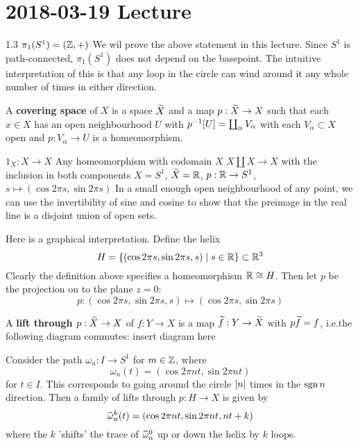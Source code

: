 \section{2018-03-19 Lecture}

1.3 $\pi_1(S^1)=(\mathbb{Z},+)$
We wil prove the above statement in this lecture.
Since $S^1$ is path-connected, $\pi_1(S^1)$ does not depend on the basepoint.
The intuitive interpretation of this is that any loop in the circle can wind around it any whole number of times in either direction.

\begin{defn}
	A \textbf{covering space} of $X$ is a space $\widetilde{X}$ and a map $p: \widetilde X \to X$ such that each $x \in X$ has an open neighbourhood $U$ with $p^{-1}[U] = \coprod_\alpha V_\alpha$ with each $V_\alpha \subset X$ open and $p: V_\alpha \to U$ is a homeomorphism.
\end{defn}

\begin{exam}
	\begin{itm}
		\io $1_X: X \to X$
		\io Any homeomorphism with codomain $X$
		\io $X \amalg X \to X$ with the inclusion in both components
		\io $X=S^1$, $\widetilde X = \mathbb{R}$, $p: \mathbb{R} \to S^1$, $s \mapsto (\cos 2\pi s, \sin 2\pi s)$
		In a small enough open neighbourhood of any point, we can use the invertibility of sine and cosine to show that the preimage in the real line is a disjoint union of open sets.
		
		Here is a graphical interpretation.
		Define the helix
		\[H = \{(\cos 2\pi s, \sin 2\pi s, s) \mid s \in \mathbb{R}\} \subset \mathbb{R}^3\]
		Clearly the definition above specifies a homeomorphism $\mathbb{R} \cong H$.
		Then let $p$ be the projection on to the plane $z=0$:
		\[p: (\cos 2\pi s, \sin 2\pi s, s) \mapsto (\cos 2\pi s, \sin 2\pi s)\]
	\end{itm}
\end{exam}

\begin{defn}
	A \textbf{lift through $p: \widetilde X \to X$} of $f: Y \to X$ is a map $\widetilde f: Y \to \widetilde X$ with $p \widetilde f = f$, i.e.\@ the following diagram commutes:
	insert diagram here
\end{defn}

\begin{exam}
	Consider the path $\omega_n: I \to S^1$ for $m \in \mathbb{Z}$, where
	\[\omega_n(t) = (\cos 2\pi nt, \sin 2\pi nt)\]
	for $t \in I$.
	This corresponds to going around the circle $\left\lvert n \right\rvert$ times in the $\operatorname{sgn}{n}$ direction.
	Then a family of lifts through $p: H \to X$ is given by
	\[\widetilde\omega_n^k(t) = (\cos 2\pi nt, \sin 2\pi nt, nt+k)\]
	where the $k$ 'shifts' the trace of $\widetilde\omega_n^0$ up or down the helix by $k$ loops.
\end{exam}

